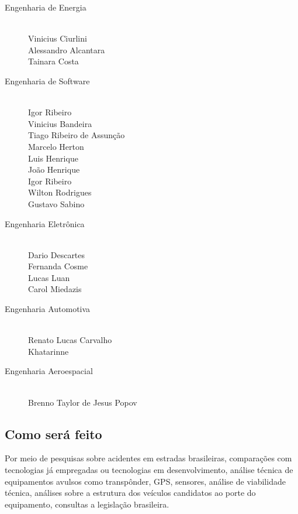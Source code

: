 \begin{description}
  \item[Engenharia de Energia] \hfill
  \\Vinicius Ciurlini
  \\Alessandro Alcantara
  \\Tainara Costa
  \item[Engenharia de Software] \hfill
  \\Igor Ribeiro
  \\Vinicius Bandeira
  \\Tiago Ribeiro de Assunção
  \\Marcelo Herton
  \\Luis Henrique
  \\João Henrique
  \\Igor Ribeiro
  \\Wilton Rodrigues
  \\Gustavo Sabino
  \item[Engenharia Eletrônica] \hfill
  \\Dario Descartes
  \\Fernanda Cosme
  \\Lucas Luan
  \\Carol Miedazis
  \item[Engenharia Automotiva] \hfill
  \\Renato Lucas Carvalho
  \\Khatarinne
  \item[Engenharia Aeroespacial] \hfill
  \\Brenno Taylor de Jesus Popov
\end{description}

\subsection{Como será feito}
Por meio de pesquisas sobre acidentes em estradas brasileiras, comparações com tecnologias já empregadas ou tecnologias em desenvolvimento,  análise técnica de equipamentos avulsos como transpônder, GPS,  sensores, análise de viabilidade técnica, análises sobre a estrutura dos veículos candidatos ao porte do equipamento, consultas a legislação brasileira.
